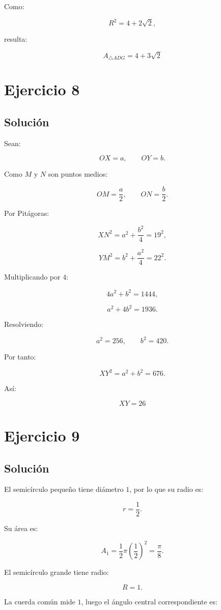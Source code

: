 \documentclass[11pt,a4paper]{article}
\begin{document}
Como:

\[
R^2=4+2\sqrt2,
\]

resulta:

\[
\boxed{
A_{\triangle ADG}
=
4+3\sqrt2
}
\]

\section{Ejercicio 8}
\subsection{Solución}

Sean:

\[
OX=a,
\qquad
OY=b.
\]

Como \(M\) y \(N\) son puntos medios:

\[
OM=\frac a2,
\qquad
ON=\frac b2.
\]

Por Pitágoras:

\[
XN^2
=
a^2+\frac{b^2}{4}
=
19^2,
\]

\[
YM^2
=
b^2+\frac{a^2}{4}
=
22^2.
\]

Multiplicando por \(4\):

\[
4a^2+b^2=1444,
\]

\[
a^2+4b^2=1936.
\]

Resolviendo:

\[
a^2=256,
\qquad
b^2=420.
\]

Por tanto:

\[
XY^2
=
a^2+b^2
=
676.
\]

Así:

\[
\boxed{XY=26}
\]

\section{Ejercicio 9}
\subsection{Solución}

El semicírculo pequeño tiene diámetro \(1\), por lo que su radio es:

\[
r=\frac12.
\]

Su área es:

\[
A_1
=
\frac12\pi\left(\frac12\right)^2
=
\frac{\pi}{8}.
\]

El semicírculo grande tiene radio:

\[
R=1.
\]

La cuerda común mide \(1\), luego el ángulo central correspondiente es:
\end{document}
